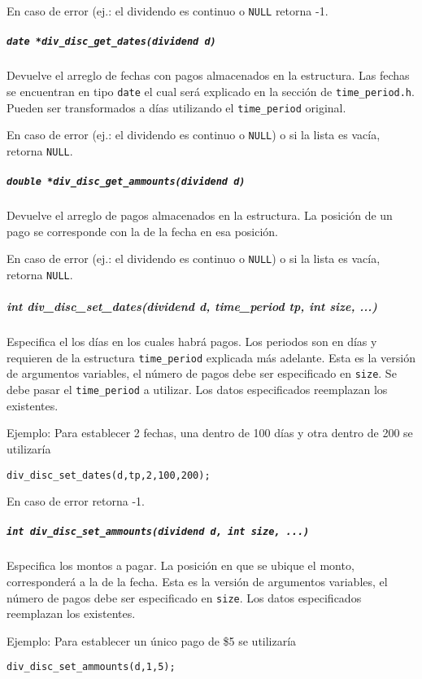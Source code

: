 \documentclass[12pt,a4paper,final]{article}
\begin{document}
				En caso de error (ej.: el dividendo es continuo o \texttt{NULL} retorna -1.
				
			\subparagraph{\texttt{date *div\_disc\_get\_dates(dividend d)}}
				Devuelve el arreglo de fechas con pagos almacenados en la estructura.
				Las fechas se encuentran en tipo \texttt{date} el cual será explicado
				en la sección de \texttt{time\_period.h}. Pueden ser transformados a días
				utilizando el \texttt{time\_period} original.
					
				En caso de error (ej.: el dividendo es continuo o \texttt{NULL}) o si
				la lista es vacía, retorna \texttt{NULL}.
				
			\subparagraph{\texttt{double *div\_disc\_get\_ammounts(dividend d)}}
				Devuelve el arreglo de pagos almacenados en la estructura.
				La posición de un pago se corresponde con la de la fecha en esa posición.
					
				En caso de error (ej.: el dividendo es continuo o \texttt{NULL}) o si
				la lista es vacía, retorna \texttt{NULL}.
			
			\subparagraph{int div\_disc\_set\_dates(dividend d, time\_period tp, int size, ...)}
				Especifica el los días en los cuales habrá pagos. Los periodos son en días y requieren
				de la estructura \texttt{time\_period} explicada más adelante.
				Esta es la versión de argumentos variables, el número de pagos debe ser especificado
				en \texttt{size}. Se debe pasar el \texttt{time\_period} a utilizar. Los datos 
				especificados reemplazan los existentes.
					
				Ejemplo: Para establecer 2 fechas, una dentro de 100 días y otra dentro de 200
					se utilizaría
					\begin{alltt}
						div_disc_set_dates(d, tp, 2, 100, 200);
					\end{alltt}
						
				En caso de error retorna -1.
					
			\subparagraph{\texttt{int div\_disc\_set\_ammounts(dividend d, int size, ...)}}
				Especifica los montos a pagar. La posición en que se ubique el monto, corresponderá
				a la de la fecha. Esta es la versión de argumentos variables, el número de pagos debe ser
				especificado en \texttt{size}. Los datos especificados reemplazan los existentes.
					
				Ejemplo: Para establecer un único pago de \$5 se utilizaría
					\begin{alltt}
						div_disc_set_ammounts(d, 1, 5);
					\end{alltt}
						
\end{document}
